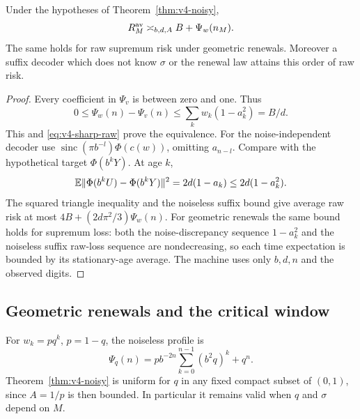 \begin{corollary}\label{cor:v4-noise-memory}
Under the hypotheses of Theorem~\ref{thm:v4-noisy},
\begin{equation}
 R_M^{\rm av}\asymp_{b,d,A} B+\Psi_w(n_M).                       \label{eq:v4-noise-plus-memory}
\end{equation}
The same holds for raw supremum risk under geometric renewals.
Moreover a suffix decoder which does not know $\sigma$ or the
renewal law attains this order of raw risk.
\end{corollary}
\begin{proof}
Every coefficient in $\Psi_v$ is between zero and one. Thus
\[
 0\le\Psi_w(n)-\Psi_v(n)
 \le\sum_k w_k(1-a_k^2)=B/d.
\]
This and \eqref{eq:v4-sharp-raw} prove the equivalence.
For the noise-independent decoder use
$\operatorname{sinc}(\pi b^{-l})\Phi(c(w))$, omitting $a_{n-l}$.
Compare with the hypothetical target $\Phi(b^kY)$.
At age $k$,
\[
 \mathbb E\|\Phi(b^kU)-\Phi(b^kY)\|^2
 =2d(1-a_k)\le2d(1-a_k^2).
\]
The squared triangle inequality and the noiseless suffix bound give
average raw risk at most $4B+(2d\pi^2/3)\Psi_w(n)$.
For geometric renewals the same bound holds for supremum loss:
both the noise-discrepancy sequence $1-a_k^2$ and the noiseless
suffix raw-loss sequence are nondecreasing, so each time expectation
is bounded by its stationary-age average. The machine uses only
$b,d,n$ and the observed digits.
\end{proof}

\subsection{Geometric renewals and the critical window}
For $w_k=pq^k$, $p=1-q$, the noiseless profile is
\begin{equation}
 \Psi_q(n)
 =p b^{-2n}\sum_{k=0}^{n-1}(b^2q)^k+q^n.                        \label{eq:v4-geometric-profile}
\end{equation}
Theorem~\ref{thm:v4-noisy} is uniform for $q$ in any fixed compact
subset of $(0,1)$, since $A=1/p$ is then bounded. In particular it
remains valid when $q$ and $\sigma$ depend on $M$.

